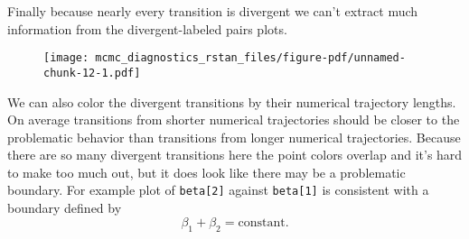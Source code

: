 \documentclass[
  letterpaper,
  DIV=11,
  numbers=noendperiod]{scrartcl}
\newenvironment{Shaded}{\begin{snugshade}}{\end{snugshade}}
\newcommand{\AttributeTok}[1]{\textcolor[rgb]{0.40,0.45,0.13}{#1}}
\newcommand{\ControlFlowTok}[1]{\textcolor[rgb]{0.00,0.23,0.31}{#1}}
\newcommand{\DecValTok}[1]{\textcolor[rgb]{0.68,0.00,0.00}{#1}}
\newcommand{\FunctionTok}[1]{\textcolor[rgb]{0.28,0.35,0.67}{#1}}
\newcommand{\NormalTok}[1]{\textcolor[rgb]{0.00,0.23,0.31}{#1}}
\newcommand{\OtherTok}[1]{\textcolor[rgb]{0.00,0.23,0.31}{#1}}
\newcommand{\SpecialCharTok}[1]{\textcolor[rgb]{0.37,0.37,0.37}{#1}}
\newcommand{\StringTok}[1]{\textcolor[rgb]{0.13,0.47,0.30}{#1}}
\begin{document}
Finally because nearly every transition is divergent we can't extract
much information from the divergent-labeled pairs plots.

\begin{Shaded}
\end{Shaded}

\begin{figure}[H]

{\centering \texttt{[image: mcmc\_diagnostics\_rstan\_files/figure-pdf/unnamed-chunk-12-1.pdf]}

}

\end{figure}

We can also color the divergent transitions by their numerical
trajectory lengths. On average transitions from shorter numerical
trajectories should be closer to the problematic behavior than
transitions from longer numerical trajectories. Because there are so
many divergent transitions here the point colors overlap and it's hard
to make too much out, but it does look like there may be a problematic
boundary. For example plot of \texttt{beta{[}2{]}} against
\texttt{beta{[}1{]}} is consistent with a boundary defined by \[
\beta_{1} + \beta_{2} = \mathrm{constant}.
\]

\begin{Shaded}
\end{Shaded}
\end{document}
